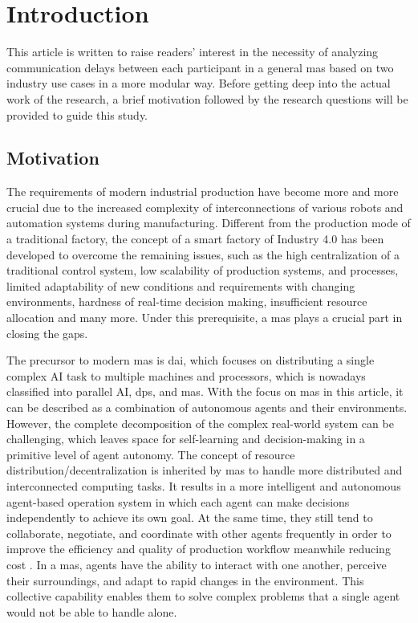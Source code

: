 \glsresetall%
\chapter{Introduction}%
This article is written to raise readers' interest in the necessity of 
analyzing communication delays between each participant in a general 
\gls{mas} based on two industry use cases in a more modular way. 
Before getting deep into the actual work of the research, 
a brief motivation followed by the research questions will be
provided to guide this study.

\section{Motivation}\label{chap: Motivation}
The requirements of modern industrial production have become more and 
more crucial due to the increased complexity of interconnections of 
various robots and automation systems during manufacturing. Different 
from the production mode of a traditional factory, the concept of a 
smart factory of Industry 4.0 has been developed to overcome the 
remaining issues, such as the high centralization of a traditional 
control system, low scalability of production systems, and processes, 
limited adaptability of new conditions and requirements with changing 
environments, hardness of real-time decision making, insufficient resource 
allocation and many more. Under this prerequisite, a \gls{mas} plays a crucial 
part in closing the gaps. 


The precursor to modern \gls{mas} is \gls{dai}, which focuses on distributing a 
single complex AI task to multiple machines and processors\cite{noauthor_jacques_nodate}, 
which is nowadays classified into parallel AI, \gls{dps}, and \gls{mas}\cite{dorri_multi-agent_2018}. 
With the focus on \gls{mas} in this article, it can be described as a combination of 
autonomous agents and their environments. However, the complete decomposition of 
the complex real-world system can be challenging, which leaves space for self-learning 
and decision-making in a primitive level of agent autonomy\cite{reis_applications_2004}. 
The concept of resource distribution/decentralization is inherited by \gls{mas} to 
handle more distributed and interconnected computing tasks. It results in a more 
intelligent and autonomous agent-based operation system in which each agent can make 
decisions independently to achieve its own goal. At the same time, they still tend 
to collaborate, negotiate, and coordinate with other agents frequently in order to 
improve the efficiency and quality of production workflow meanwhile reducing 
cost \cite{vogel-heuser_multi-agent_2020}. In a \gls{mas}, agents have the ability 
to interact with one another, perceive their surroundings, and adapt to rapid changes 
in the environment. This collective capability enables them to solve complex problems 
that a single agent would not be able to handle alone. 

